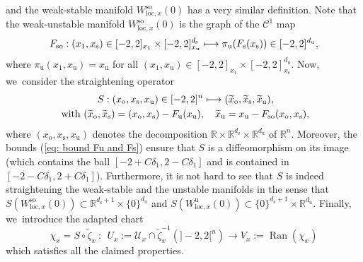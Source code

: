 \documentclass[11pt]{article}
\newcommand\mto{\mathchoice{\longmapsto}{\mapsto}{\mapsto}{\mapsto}}
\newcommand{\loc}{\mathrm{loc}}
\newcommand{\ro}{\mathrm{o}}
\newcommand{\rs}{\mathrm{s}}
\newcommand{\rso}{\mathrm{so}}
\newcommand{\ru}{\mathrm{u}}
\theoremstyle{definition}
\theoremstyle{plain}
\newcommand{\Ccal}{\mathcal{C}}
\newcommand{\R}{\mathbb{R}}
\newcommand{\Ucal}{\mathcal{U}}
\DeclareMathOperator{\Ran}{Ran}
\begin{document}
\begin{appendix}
\[\]
and the weak-stable manifold $ W_{\loc,x}^{\rso} (0)$ has a very similar definition. Note that the weak-unstable manifold $W_{\loc,x}^{\rso} (0)$ is the graph of the $\Ccal^{1}$ map
\[
F_{\rso}: (x_1, x_\rs) \in [-2,2]_{x_1} \times [-2,2]_{x_\ru}^{d_\rs} \mto \pi_\ru (F_\rs (x_\rs)) \in [-2,2]^{d_\ru},
\]
where $\pi_\ru (x_1,x_\ru) = x_\ru$ for all $(x_1,x_\ru) \in [-2,2]_{x_1} \times [-2,2]_{x_\rs}^{d_\ru}$. Now, we~consider the straightening operator
\begin{align*}
& \qquad \qquad S: (x_\ro, x_\rs, x_\ru) \in [-2,2]^{n} \mto (\widetilde{x}_\ro, \widetilde{x}_\rs, \widetilde{x}_\ru), \\
&\text{ with } (\widetilde{x}_\ro, \widetilde{x}_\rs)= (x_\ro, x_\rs) - F_\ru (x_\ru), \quad \widetilde{x}_\ru= x_\ru - F_{\rso} (x_\ro,x_\rs),
\end{align*}
where $(x_\ro, x_\rs,x_\ru)$ denotes the decomposition $\R \times \R^{d_\rs} \times \R^{d_\ru} $ of $\R^n$. Moreover, the bounds (\ref{eq: bound Fu and Fs}) ensure that $S$ is a diffeomorphism on its image (which contains the ball $[-2 + C\delta_1,2 - C\delta_1]$ and is contained in $[-2 - C\delta_1,2 + C\delta_1]$). Furthermore, it is not hard to see that $S$ is indeed straightening the weak-stable and the unstable manifolds in the sense that $ S (W_{\loc,x}^{\rso} (0)) \subset \R^{d_\rs + 1} \times \{0\}^{d_\ru}$ and $ S (W_{\loc,x}^{\ru} (0)) \subset \{0\}^{d_\rs + 1} \times \R^{d_\ru}$. Finally, we~introduce the adapted chart
\[
\chi_x = S \circ \widetilde{\zeta}_x \:: \: \: U_x:= \Ucal_x \cap \widetilde{\zeta}_x^{-1} (]-2,2[^n) \to V_x:= \Ran (\chi_x)
\]
which satisfies all the claimed properties.


\end{appendix}
\end{document}
